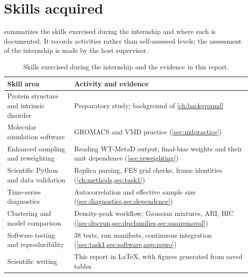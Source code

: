 \section{Skills acquired}
 summarizes the skills exercised during the internship and where each is documented. It records activities rather than self-assessed levels; the assessment of the internship is made by the host supervisor.

\begin{table}[htbp]
\centering
\caption{Skills exercised during the internship and the evidence in this report.}
\label{tab:skills}
\begin{tabularx}{\textwidth}{@{}>{\raggedright\arraybackslash}p{}X@{}}
\toprule
Skill area & Activity and evidence\\
\midrule
Protein structure and intrinsic disorder & Preparatory study; background of \cref{ch:background}\\
Molecular simulation software & GROMACS and VMD practice (\cref{sec:mdpractice})\\
Enhanced sampling and reweighting & Reading WT-MetaD output; final-bias weights and their unit dependence (\cref{sec:reweighting})\\
Scientific Python and data validation & Replica parsing, FES grid checks, frame identities (\cref{ch:methods,sec:task1})\\
Time-series diagnostics & Autocorrelation and effective sample size (\cref{sec:diagnostics,sec:dependence})\\
Clustering and model comparison & Density-peak workflow; Gaussian mixtures, ARI, BIC (\cref{sec:dpcrun,sec:dpcfamilies,sec:sasaremoval})\\
Software testing and reproducibility & 38 tests, run manifests, continuous integration (\cref{sec:task1,sec:software,app:repro})\\
Scientific writing & This report in LaTeX, with figures generated from saved tables\\
\bottomrule
\end{tabularx}
\end{table}

